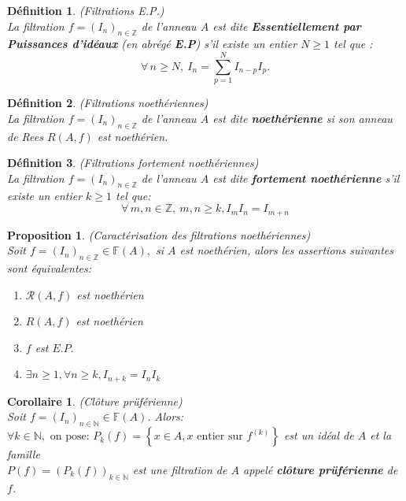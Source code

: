 \documentclass[12pt, a4paper, oneside]{article}
\newtheorem{madefinition}{Définition}
\newtheorem{maproposition}{Proposition}
\newtheorem{moncorollaire}{Corollaire}
\begin{document}
	\begin{madefinition}(Filtrations E.P.)\\
		La filtration $f = (I_n)_{n \in \mathbb{Z}}$ de l'anneau $A$ est dite \textbf{Essentiellement par Puissances d'idéaux} (en abrégé \textbf{E.P}) s'il existe un entier $N \geqslant 1$ tel que :
		\[ \forall \, n \geqslant N, \ I_n =\sum_{p=1}^{N} I_{n-p}I_p. \]
	\end{madefinition}
	\begin{madefinition}(Filtrations noethériennes) \\
		La filtration $f = (I_n)_{n \in \mathbb{Z}}$ de l'anneau $A$ est dite \textbf{noethérienne} si son anneau de Rees ${R}(A,f)$ est noethérien.
	\end{madefinition}
	\begin{madefinition}(Filtrations fortement noethériennes) \\
		La filtration $f = (I_n)_{n \in \mathbb{Z}}$ de l'anneau $A$ est dite \textbf{fortement noethérienne} s'il existe un entier $k \geqslant 1$ tel que:
		\[ \forall \, m, n \in \mathbb{Z}, \ m, n \geqslant k, I_m I_n = I_{m+n} \]
	\end{madefinition}
	\begin{maproposition}(Caractérisation des filtrations noethériennes)\\
		Soit $f=(I_{n})_{n \in \mathbb{Z}}\in \mathbb{F}(A),$ si $A$ est noethérien, alors les assertions suivantes sont équivalentes:
		\begin{enumerate}
			\item[(i)] $\mathcal{R}(A,f)$ est noethérien
			\item[(ii)] $R(A,f)$ est noethérien
			\item[(iii)] $f$ est $E.P.$
			\item[(iv)] $\exists n \geqslant 1,\forall n \geqslant k, I_{n+k} = I_nI_k$
		\end{enumerate}
	\end{maproposition}
	\begin{moncorollaire}(Clôture prüférienne)\\
		Soit $f=(I_n)_{n \in \mathbb{N}} \in \mathbb{F}(A)$. Alors:\\
		$\forall k \in \mathbb{N}, \text{ on pose: } P_k(f)=\left\{x \in A, x \text{ entier sur } f^{(k)}\right\}$ est un idéal de $A$ et la famille \\ $P(f)=(P_k(f))_{k \in \mathbb{N}}$ est une filtration de $A$ appelé \textbf{clôture prüférienne} de $f$.
	\end{moncorollaire}
\end{document}
